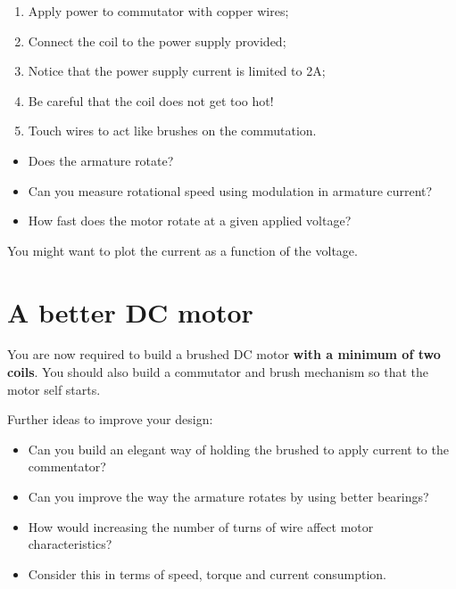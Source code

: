 \documentclass{instructions}
\begin{document}

\begin{enumerate}
\item Apply power to commutator with copper wires;
\item Connect the coil to the power supply provided;
\item Notice that the power supply current is limited to 2A;
\item Be careful that the coil does not get too hot!
\item Touch wires to act like brushes on the commutation.
\end{enumerate}


\begin{itemize}
\item Does the armature rotate?
\item Can you measure rotational speed using modulation in armature current?
\item How fast does the motor rotate at a given applied voltage?
\end{itemize}

You might want to plot the current as a function of the voltage.


\part{A better DC motor}

You are now required to build a brushed DC motor \textbf{with a minimum of two
coils}. You should also build a commutator and brush mechanism so that
the motor self starts.

Further ideas to improve your design:

\begin{itemize}
\item Can you build an elegant way of holding the brushed to apply current
  to the commentator?
\item Can you improve the way the armature rotates by using better bearings?
\item How would increasing the number of turns of wire affect motor
  characteristics?
\item Consider this in terms of speed, torque and current consumption.
\end{itemize}
\end{document}
